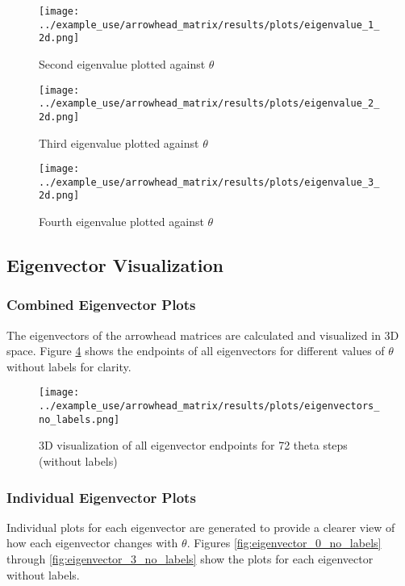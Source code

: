 \begin{figure}[H]
    \centering
    \texttt{[image: ../example\_use/arrowhead\_matrix/results/plots/eigenvalue\_1\_2d.png]}
    \caption{Second eigenvalue plotted against $\theta$}
    \label{fig:eigenvalue_1_2d}
\end{figure}

\begin{figure}[H]
    \centering
    \texttt{[image: ../example\_use/arrowhead\_matrix/results/plots/eigenvalue\_2\_2d.png]}
    \caption{Third eigenvalue plotted against $\theta$}
    \label{fig:eigenvalue_2_2d}
\end{figure}

\begin{figure}[H]
    \centering
    \texttt{[image: ../example\_use/arrowhead\_matrix/results/plots/eigenvalue\_3\_2d.png]}
    \caption{Fourth eigenvalue plotted against $\theta$}
    \label{fig:eigenvalue_3_2d}
\end{figure}



\subsection{Eigenvector Visualization}

\subsubsection{Combined Eigenvector Plots}

The eigenvectors of the arrowhead matrices are calculated and visualized in 3D space. Figure \ref{fig:eigenvectors_no_labels} shows the endpoints of all eigenvectors for different values of $\theta$ without labels for clarity.

\begin{figure}[H]
    \centering
    \texttt{[image: ../example\_use/arrowhead\_matrix/results/plots/eigenvectors\_no\_labels.png]}
    \caption{3D visualization of all eigenvector endpoints for 72 theta steps (without labels)}
    \label{fig:eigenvectors_no_labels}
\end{figure}



\subsubsection{Individual Eigenvector Plots}

Individual plots for each eigenvector are generated to provide a clearer view of how each eigenvector changes with $\theta$. Figures \ref{fig:eigenvector_0_no_labels} through \ref{fig:eigenvector_3_no_labels} show the plots for each eigenvector without labels.

